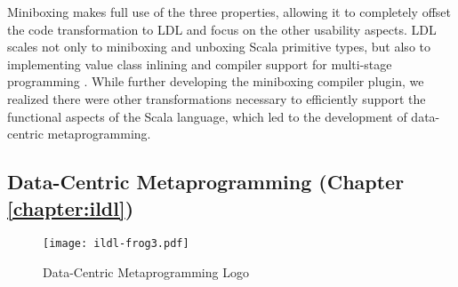 %

Miniboxing makes full use of the three properties, allowing it to completely offset the code transformation to LDL and focus on the other usability aspects. LDL scales not only to miniboxing and unboxing Scala primitive types, but also to implementing value class inlining \cite{gosling-value-classes,rose-value-classes-tearing,rose-value-classes-vm} and compiler support for multi-stage programming \cite{tiark-lms, scala-virtualized}. While further developing the miniboxing compiler plugin, we realized there were other transformations necessary to efficiently support the functional aspects of the Scala language, which led to the development of data-centric metaprogramming.

\subsection{Data-Centric Metaprogramming (Chapter \ref{chapter:ildl})}

\begin{wrapfigure}{r}{40mm}
  \centering
  \vspace{-2em}
  \texttt{[image: ildl-frog3.pdf]}
  \vspace{-1em}
  \caption{Data-Centric Metaprogramming Logo}
  \vspace{-2em}
\end{wrapfigure}


